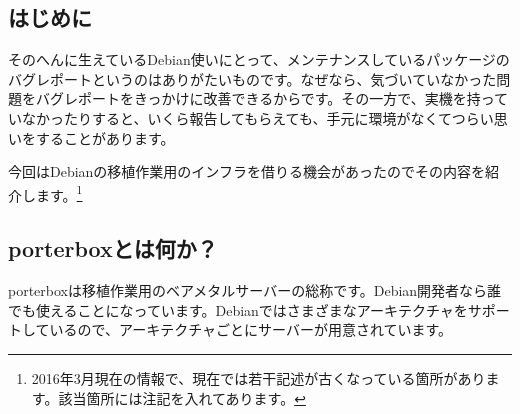 \documentclass[mingoth,a4paper]{jsarticle}
\begin{document}
%
%


%
%
%
%





\subsection{はじめに}

そのへんに生えているDebian使いにとって、メンテナンスしているパッケージのバグレポートというのはありがたいものです。なぜなら、気づいていなかった問題をバグレポートをきっかけに改善できるからです。その一方で、実機を持っていなかったりすると、いくら報告してもらえても、手元に環境がなくてつらい思いをすることがあります。

今回はDebianの移植作業用のインフラを借りる機会があったのでその内容を紹介します。\footnote{2016年3月現在の情報で、現在では若干記述が古くなっている箇所があります。該当箇所には注記を入れてあります。}

\subsection{porterboxとは何か？}

porterboxは移植作業用のベアメタルサーバーの総称です。Debian開発者なら誰でも使えることになっています。Debianではさまざまなアーキテクチャをサポートしているので、アーキテクチャごとにサーバーが用意されています。
\end{document}
